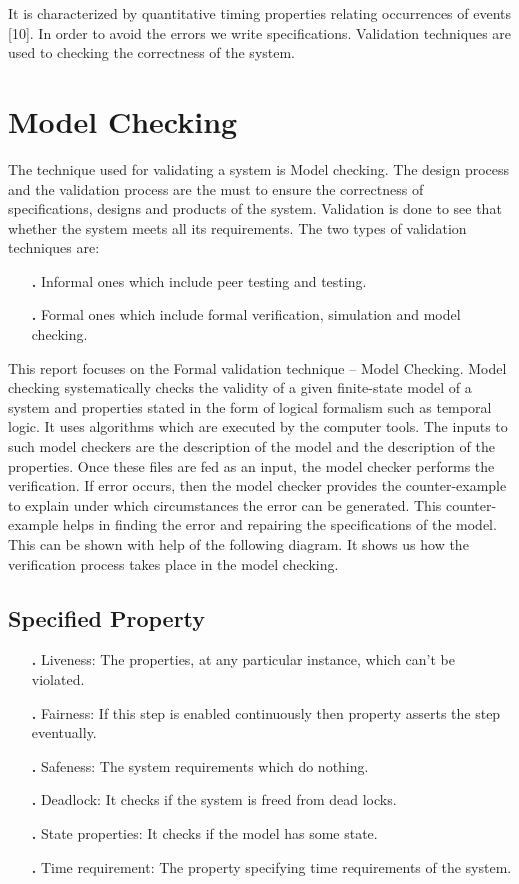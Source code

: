 \documentclass{article}
\begin{document}
It is characterized by quantitative timing properties relating occurrences of events [10].
In order to avoid the errors we write specifications. Validation techniques are used to checking the correctness of the system. 
\section{Model Checking}
The technique used for validating a system is Model checking. The design process and the validation process are the must to ensure the correctness of specifications, designs and products of the system. Validation is done to see that whether the system meets all its requirements. 
The two types of validation techniques are: 
\begin{itemize}
\item[\textbf{.}]Informal ones which include peer testing and testing.

\end{itemize}	
\begin{itemize}
\item[\textbf{.}]Formal ones which include formal verification, simulation and model checking. 

\end{itemize}	
This report focuses on the Formal validation technique – Model Checking. 
Model checking systematically checks the validity of a given finite-state model of a system and properties stated in the form of logical formalism such as temporal logic. It uses algorithms which are executed by the computer tools. The inputs to such model checkers are the description of the model and the description of the properties. Once these files are fed as an input, the model checker performs the verification. If error occurs, then the model checker provides the counter-example to explain under which circumstances the error can be generated. This counter-example helps in finding the error and repairing the specifications of the model. This can be shown with help of the following diagram. It shows us how the verification process takes place in the model checking.                                                  
\subsection{Specified Property}
\begin{itemize}
\item[\textbf{.}]Liveness: The properties, at any particular instance, which can’t be violated.
\item[\textbf{.}]Fairness: If this step is enabled continuously then property asserts the step eventually.
\item[\textbf{.}]Safeness: The system requirements which do nothing.
\item[\textbf{.}]Deadlock: It checks if the system is freed from dead locks.
\item[\textbf{.}]State properties: It checks if the model has some state.
\item[\textbf{.}]Time requirement: The property specifying time requirements of the system. 

\end{itemize}
\end{document}
